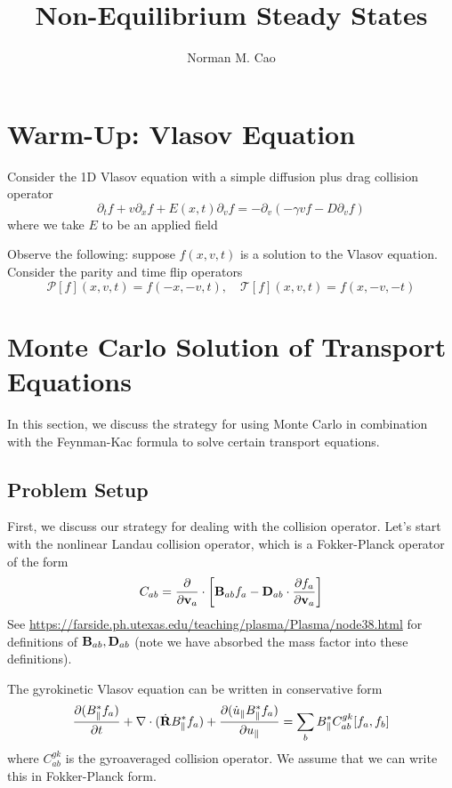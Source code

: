 \documentclass[]{article}
\title{Non-Equilibrium Steady States}
\author{Norman M. Cao}
\begin{document}
\maketitle



\section{Warm-Up: Vlasov Equation}

Consider the 1D Vlasov equation with a simple diffusion plus drag collision operator
\begin{equation}
    \partial_t f + v \partial_x f + E(x,t) \partial_v f = -\partial_v (-\gamma v f - D \partial_v f)
\end{equation}
where we take \(E\) to be an applied field

Observe the following: suppose \(f(x,v,t)\) is a solution to the Vlasov equation.
Consider the parity and time flip operators
\begin{equation*}
    \mathcal{P}[f](x,v,t) = f(-x,-v,t), \quad \mathcal{T}[f](x,v,t) = f(x,-v,-t)
\end{equation*}


\section{Monte Carlo Solution of Transport Equations}

In this section, we discuss the strategy for using Monte Carlo in combination with the Feynman-Kac formula to solve certain transport equations.


\subsection{Problem Setup}

First, we discuss our strategy for dealing with the collision operator.
Let's start with the nonlinear Landau collision operator, which is a Fokker-Planck operator of the form
\begin{equation}
	C_{ab} = \pdv{\vb{v}_a} \cdot \left[\vb{B}_{ab} f_a - \vb{D}_{ab} \cdot \pdv{f_a}{\vb{v}_a}\right]
\end{equation}
See \url{https://farside.ph.utexas.edu/teaching/plasma/Plasma/node38.html} for definitions of \(\vb{B}_{ab}, \vb{D}_{ab}\) (note we have absorbed the mass factor into these definitions).

The gyrokinetic Vlasov equation can be written in conservative form
\begin{equation}
	\pdv{(B_\parallel^* f_a)}{t} + \nabla \cdot (\dot{\vb{R}} B_\parallel^* f_a) + \pdv{(\dot{u}_\parallel B_\parallel^* f_a)}{u_\parallel} = \sum_{b} B_\parallel^* C_{ab}^{gk}[f_a, f_b]
\end{equation}
where \(C_{ab}^{gk}\) is the gyroaveraged collision operator.
We assume that we can write this in Fokker-Planck form.
\end{document}
